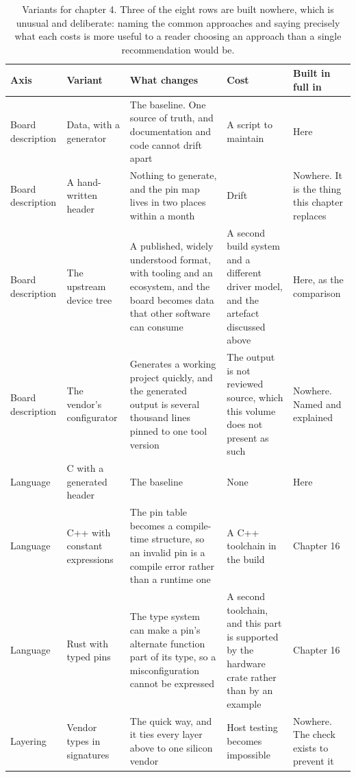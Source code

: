 \begin{table}[H]\centering\small
\begin{tabular}{p{24mm}p{26mm}p{44mm}p{22mm}p{20mm}}
\toprule
Axis & Variant & What changes & Cost & Built in full in \\
\midrule
Board description & Data, with a generator & The baseline. One source of truth, and documentation and code cannot drift apart & A script to maintain & Here \\
Board description & A hand-written header & Nothing to generate, and the pin map lives in two places within a month & Drift & Nowhere. It is the thing this chapter replaces \\
Board description & The upstream device tree & A published, widely understood format, with tooling and an ecosystem, and the board becomes data that other software can consume & A second build system and a different driver model, and the artefact discussed above & Here, as the comparison \\
Board description & The vendor's configurator & Generates a working project quickly, and the generated output is several thousand lines pinned to one tool version & The output is not reviewed source, which this volume does not present as such & Nowhere. Named and explained \\
Language & C with a generated header & The baseline & None & Here \\
Language & C++ with constant expressions & The pin table becomes a compile-time structure, so an invalid pin is a compile error rather than a runtime one & A C++ toolchain in the build & Chapter 16 \\
Language & Rust with typed pins & The type system can make a pin's alternate function part of its type, so a misconfiguration cannot be expressed & A second toolchain, and this part is supported by the hardware crate rather than by an example & Chapter 16 \\
Layering & Vendor types in signatures & The quick way, and it ties every layer above to one silicon vendor & Host testing becomes impossible & Nowhere. The check exists to prevent it \\
\bottomrule
\end{tabular}
\caption{Variants for chapter 4. Three of the eight rows are built nowhere, which is unusual and deliberate: naming the common approaches and saying precisely what each costs is more useful to a reader choosing an approach than a single recommendation would be.}
\end{table}

